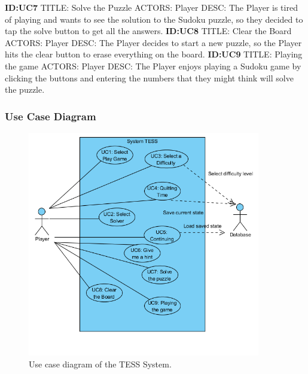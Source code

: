\documentclass{article}
\begin{document}
\textbf{ID:UC7} \newline TITLE: Solve the Puzzle \newline ACTORS: Player \newline DESC: The Player is tired of playing and wants to see the solution to the Sudoku puzzle, so they decided to tap the solve button to get all the answers. \newline \newline
\textbf{ID:UC8} \newline TITLE: Clear the Board \newline ACTORS: Player \newline DESC: The Player decides to start a new puzzle, so the Player hits the clear button to erase everything on the board. \newline \newline
\textbf{ID:UC9} \newline TITLE: Playing the game \newline ACTORS: Player \newline DESC: The Player enjoys playing a Sudoku game by clicking the buttons and entering the numbers that they might think will solve the puzzle. \newline \newline

\subsubsection{Use Case Diagram}

\begin{figure}[h!]\centering
	\includegraphics[width=4.0in]{./Figure/Usecase_Diagram.PNG}
	\caption{Use case diagram of the TESS System.}\label{fig:usecasediagram}
\end{figure}
\end{document}
